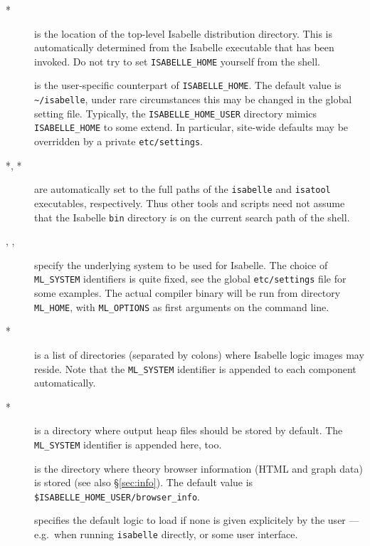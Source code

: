 \begin{description}
\item[*] is the location of the top-level
  Isabelle distribution directory. This is automatically determined
  from the Isabelle executable that has been invoked.  Do not try to
  set \texttt{ISABELLE_HOME} yourself from the shell.
  
\item[] is the user-specific counterpart of
  \texttt{ISABELLE_HOME}. The default value is
  \texttt{\~\relax/isabelle}, under rare circumstances this may be
  changed in the global setting file.  Typically, the
  \texttt{ISABELLE_HOME_USER} directory mimics \texttt{ISABELLE_HOME}
  to some extend. In particular, site-wide defaults may be overridden
  by a private \texttt{etc/settings}.
  
\item[*, *] are automatically set to
  the full paths of the \texttt{isabelle} and \texttt{isatool}
  executables, respectively.  Thus other tools and scripts need not
  assume that the Isabelle \texttt{bin} directory is on the current
  search path of the shell.

\item[, , ]
  specify the underlying {\ML} system to be used for Isabelle.  The
  choice of \texttt{ML_SYSTEM} identifiers is quite fixed, see the
  global \texttt{etc/settings} file for some examples. The actual
  compiler binary will be run from directory \texttt{ML_HOME}, with
  \texttt{ML_OPTIONS} as first arguments on the command line.
  
\item[*] is a list of directories (separated by
  colons) where Isabelle logic images may reside. Note that the
  \texttt{ML_SYSTEM} identifier is appended to each component
  automatically.
  
\item[*] is a directory where output heap
  files should be stored by default. The \texttt{ML_SYSTEM} identifier
  is appended here, too.
  
\item[] is the directory where theory
  browser information (HTML and graph data) is stored (see also
  \S\ref{sec:info}).  The default value is
  \texttt{\$ISABELLE_HOME_USER/browser_info}.

\item[] specifies the default logic to load if
  none is given explicitely by the user --- e.g.\ when running
  \texttt{isabelle} directly, or some user interface.
  

\end{description}
